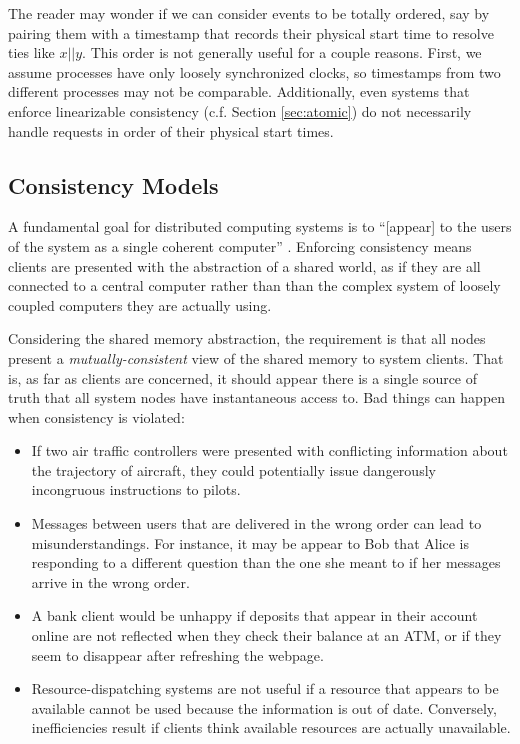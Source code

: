 \documentclass[]             %
{NASA}                       %
\theoremstyle{definition}
\begin{document}
The reader may wonder if we can consider events to be totally ordered,
say by pairing them with a timestamp that records their physical start
time to resolve ties like \(x || y\). This order is not generally useful
for a couple reasons. First, we assume processes have only loosely
synchronized clocks, so timestamps from two different processes may not
be comparable. Additionally, even systems that enforce linearizable
consistency (c.f. Section \ref{sec:atomic}) do not necessarily handle
requests in order of their physical start times.

\newpage
\subsection{Consistency Models}
\label{memory-consistency-models}

A fundamental goal for distributed computing systems is to
``{[}appear{]} to the users of the system as a single coherent
computer'' \cite{TanenbaumSteen07}. Enforcing consistency means
clients are presented with the abstraction of a shared world, as if
they are all connected to a central computer rather than than the
complex system of loosely coupled computers they are actually using.

Considering the shared memory abstraction, the requirement is that all
nodes present a \emph{mutually-consistent} view of the shared memory
to system clients. That is, as far as clients are concerned, it should
appear there is a single source of truth that all system nodes have
instantaneous access to. Bad things can happen when consistency is
violated:

\begin{itemize}
\item If two air traffic controllers were presented with conflicting
  information about the trajectory of aircraft, they could potentially
  issue dangerously incongruous instructions to pilots.
\item Messages between users that are delivered in the wrong order can
  lead to misunderstandings. For instance, it may be appear to Bob
  that Alice is responding to a different question than the one she
  meant to if her messages arrive in the wrong order.
\item A bank client would be unhappy if deposits that appear in their
  account online are not reflected when they check their balance at an
  ATM, or if they seem to disappear after refreshing the webpage.
\item Resource-dispatching systems are not useful if a resource that
  appears to be available cannot be used because the information is
  out of date. Conversely, inefficiencies result if clients think
  available resources are actually unavailable.
\end{itemize}
\end{document}
